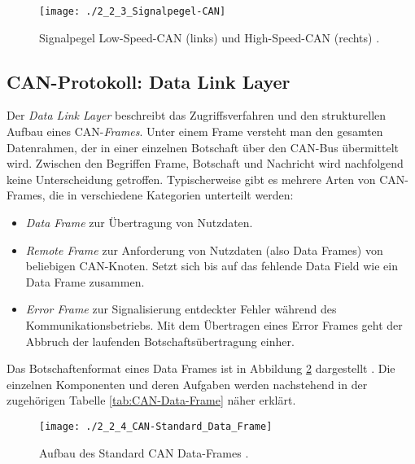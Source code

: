 \begin{figure}[!htbp]
	\centering
	\texttt{[image: ./2\_2\_3\_Signalpegel-CAN]}
	\caption{Signalpegel Low-Speed-\acs{CAN} (links) und High-Speed-\acs{CAN} (rechts) \cite{VectorInformatikGmbH.}.}
	\label{abb:CANSignalpegel}
\end{figure}

\subsection{CAN-Protokoll: Data Link Layer} \label{subsec:DataLinkLayer}
Der \emph{Data Link Layer} beschreibt das Zugriffsverfahren und den strukturellen Aufbau eines \acs{CAN}-\emph{Frames}. Unter einem Frame versteht man den gesamten Datenrahmen, der in einer einzelnen Botschaft über den \acs{CAN}-Bus übermittelt wird. Zwischen den Begriffen Frame, Botschaft und Nachricht wird nachfolgend keine Unterscheidung getroffen. Typischerweise gibt es mehrere Arten von CAN-Frames, die in verschiedene Kategorien unterteilt werden:

\begin{itemize}
	\item \emph{Data Frame} zur Übertragung von Nutzdaten.
	\item \emph{Remote Frame} zur Anforderung von Nutzdaten (also Data Frames) von beliebigen CAN-Knoten. Setzt sich bis auf das fehlende Data Field wie ein Data Frame zusammen.
	\item \emph{Error Frame} zur Signalisierung entdeckter Fehler während des Kommunikationsbetriebs. Mit dem Übertragen eines Error Frames geht der Abbruch der laufenden Botschaftsübertragung einher.
\end{itemize} 

Das Botschaftenformat eines Data Frames ist in Abbildung \ref{abb:CANDataFrame} dargestellt \cite{VectorInformatikGmbH.}. Die einzelnen Komponenten und deren Aufgaben werden nachstehend in der zugehörigen Tabelle \ref{tab:CAN-Data-Frame} näher erklärt.

\begin{figure}[!htbp]
	\centering
	\texttt{[image: ./2\_2\_4\_CAN-Standard\_Data\_Frame]}
	\caption{Aufbau des Standard \acs{CAN} Data-Frames \cite{VectorInformatikGmbH.}.}
	\label{abb:CANDataFrame}
\end{figure}

